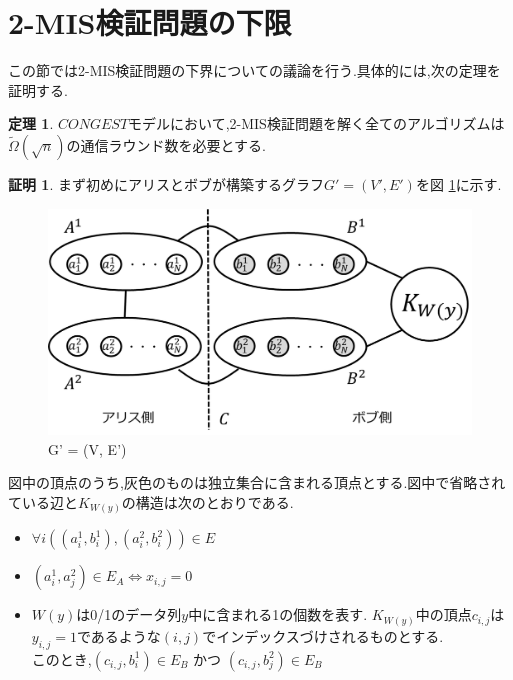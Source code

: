 \documentclass[12pt]{thesis}
\theoremstyle{definition}
\newtheorem{theorem}{定理}[chapter]
\newtheorem*{prf*}{証明}
\begin{document}
\section{2-MIS検証問題の下限}
この節では2-MIS検証問題の下界についての議論を行う.具体的には,次の定理を証明する. 
\begin{theorem}
$CONGEST$モデルにおいて,2-MIS検証問題を解く全てのアルゴリズムは$\tilde{\Omega} (\sqrt{n})$の通信ラウンド数を必要とする.
\end{theorem}
\begin{prf*}
まず初めにアリスとボブが構築するグラフ$G' = (V', E')$を図 \ref{2MIS}に示す. 

\begin{figure}[ht]
\begin{center}
\includegraphics[width=120mm]{2MIS.png}
\end{center}
\caption{G' = (V, E')}
\label{2MIS}
\end{figure}

図中の頂点のうち,灰色のものは独立集合に含まれる頂点とする.図中で省略されている辺と$K_{W(y)}$の構造は次のとおりである.
\begin{itemize}
\item $\forall i((a_{i}^{1}, b_{i}^{1}), (a_{i}^{2}, b_{i}^{2})) \in E$
\item $(a_{i}^{1}, a_{j}^{2}) \in E_{A} \Leftrightarrow x_{i, j} = 0$
\item $W(y)$は0/1のデータ列$y$中に含まれる1の個数を表す.
$K_{W(y)}$中の頂点$c_{i, j}$は$y_{i, j} = 1$であるような$(i, j)$でインデックスづけされるものとする. \\
このとき,$(c_{i, j}, b_{i}^{1}) \in E_{B}$ かつ $(c_{i, j}, b_{j}^{2}) \in E_{B}$
\end{itemize}


\end{prf*}
\end{document}
